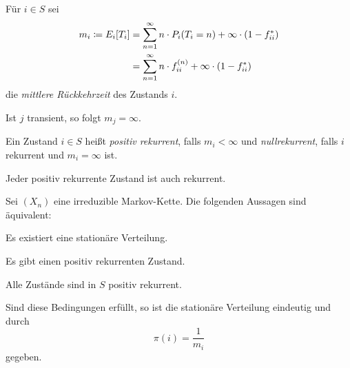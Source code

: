 \documentclass[a4paper,twoside,DIV15,BCOR12mm]{scrbook}
\begin{document}
\begin{definition}
Für $i\in S$ sei
\begin{align*}
m_i \da E_i[T_i] &= \sum_{n=1}^\infty n \cdot P_i(T_i=n) + \infty \cdot (1-f_{ii}^*) \\
&= \sum_{n=1}^\infty  n\cdot f_{ii}^{(n)} + \infty \cdot (1-f_{ii}^*)
\end{align*}
die \emph{mittlere Rückkehrzeit} des Zustands $i$.
\end{definition}

\begin{bemerkung}
Ist $j$ transient, so folgt $m_j=\infty$.
\end{bemerkung}

\begin{definition}
Ein Zustand $i\in S$ heißt \emph{positiv rekurrent}, falls $m_i<\infty$ und \emph{nullrekurrent}, falls $i$ rekurrent und $m_i=\infty$ ist.
\end{definition}

\begin{bemerkung}
Jeder positiv rekurrente Zustand ist auch rekurrent.
\end{bemerkung}

\begin{satz}
\label{satz3.2}Sei $(X_n)$ eine irreduzible Markov-Kette. Die folgenden Aussagen sind äquivalent:
\begin{enumi}
\item Es existiert eine stationäre Verteilung.
\item Es gibt einen positiv rekurrenten Zustand.
\item Alle Zustände sind in $S$ positiv rekurrent.
\end{enumi}
Sind diese Bedingungen erfüllt, so ist die stationäre Verteilung eindeutig und durch \[\pi(i)=\frac 1 {m_i}\] gegeben.
\end{satz}
\end{document}

